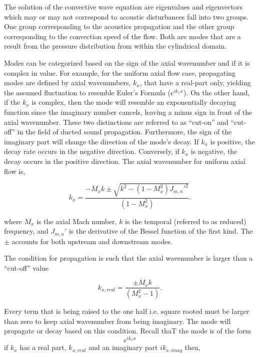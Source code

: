 \documentclass[a4paper]{report}
\begin{document}
The solution of the convective wave equation are eigenvalues and eigenvectors 
which may or may not correspond to acoustic disturbances fall into two groups.  
One group corresponding to the acoustics propagation and the other group 
corresponding to the convection speed of the flow. Both are modes that are a
result from the pressure distribution from within the cylindrical domain.  

Modes can be categorized based on the sign of the axial wavenumber and if it is
complex in value. For example, for the uniform axial flow case, propagating modes
are defined by axial wavenumbers, $k_x$, that have a real-part only, yielding 
the assumed fluctuation to resemble Euler's Formula ($e^{ik_x x}$). On the other 
hand, if the $k_x$ is complex, then the mode will resemble an exponentially decaying
function since the imaginary number cancels, leaving a minus sign in front of
the axial wavenumber. These two distinctions are referred to as ``cut-on'' and 
``cut-off'' in the field of ducted sound propagation. Furthermore, the sign of 
the imaginary part will change the direction of the mode's decay. If $k_x$ is 
positive, the decay rate occurs in the negative direction. Conversely, if $k_x$ 
is negative, the decay occurs in the positive direction. The axial wavenumber
for uniform axial flow is,

\begin{equation}
    k_x  = \frac{- M_x k \pm \sqrt{k^2 - ( 1 - M_x^2) J_{m,n}'^2 }}{\left( 1 - M_x^2 \right)}.
    \label{eqn:ax_wavenumb}
\end{equation}

where $M_x$ is the axial Mach number, $k$ is the temporal (referred to as reduced)
frequency, and $J_{m,n}'$ is the derivative of the Bessel function of the first kind.  
The $\pm$ accounts for both upstream and downstream modes.

The condition for propagation is such that the axial wavenumber is larger than 
a ``cut-off'' value

\begin{equation}
    k_{x,real}  = \frac{\pm M_x k }{\left( M_x^2 - 1 \right)}.
    \label{eqn:cuton}
\end{equation}

Every term that is being raised to the one half i.e. square rooted must 
be larger than zero to keep axial wavenumber from being imaginary. The mode 
will propagate or decay based on this condition. Recall thaT the mode is of the 
form 
\begin{equation}
    e^{i k_x x}
    \label{eqn:fluctuationexample}
\end{equation}
if $k_x$ has a real part, $k_{x,real}$ and an imaginary part $i k_{x,imag}$ 
then,
\end{document}
